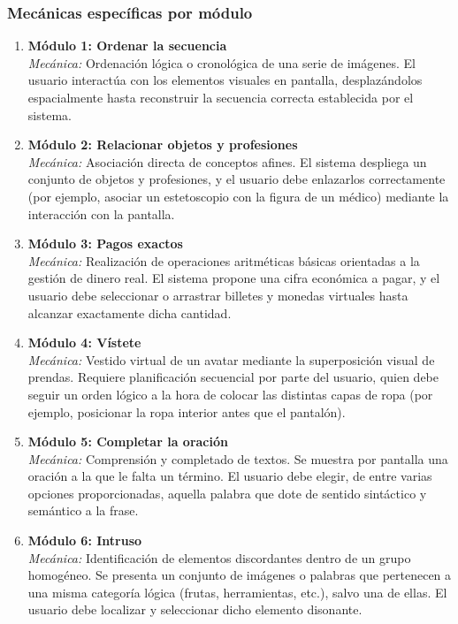 \subsubsection{Mecánicas específicas por módulo}
\begin{enumerate}
    \item \textbf{Módulo 1: Ordenar la secuencia} \\
    \textit{Mecánica:} Ordenación lógica o cronológica de una serie de imágenes. El usuario interactúa con los elementos visuales en pantalla, desplazándolos espacialmente hasta reconstruir la secuencia correcta establecida por el sistema.
    
    \item \textbf{Módulo 2: Relacionar objetos y profesiones} \\
    \textit{Mecánica:} Asociación directa de conceptos afines. El sistema despliega un conjunto de objetos y profesiones, y el usuario debe enlazarlos correctamente (por ejemplo, asociar un estetoscopio con la figura de un médico) mediante la interacción con la pantalla.
    
    \item \textbf{Módulo 3: Pagos exactos} \\
    \textit{Mecánica:} Realización de operaciones aritméticas básicas orientadas a la gestión de dinero real. El sistema propone una cifra económica a pagar, y el usuario debe seleccionar o arrastrar billetes y monedas virtuales hasta alcanzar exactamente dicha cantidad.
    
    \item \textbf{Módulo 4: Vístete} \\
    \textit{Mecánica:} Vestido virtual de un avatar mediante la superposición visual de prendas. Requiere planificación secuencial por parte del usuario, quien debe seguir un orden lógico a la hora de colocar las distintas capas de ropa (por ejemplo, posicionar la ropa interior antes que el pantalón).
    
    \item \textbf{Módulo 5: Completar la oración} \\
    \textit{Mecánica:} Comprensión y completado de textos. Se muestra por pantalla una oración a la que le falta un término. El usuario debe elegir, de entre varias opciones proporcionadas, aquella palabra que dote de sentido sintáctico y semántico a la frase.
    
    \item \textbf{Módulo 6: Intruso} \\
    \textit{Mecánica:} Identificación de elementos discordantes dentro de un grupo homogéneo. Se presenta un conjunto de imágenes o palabras que pertenecen a una misma categoría lógica (frutas, herramientas, etc.), salvo una de ellas. El usuario debe localizar y seleccionar dicho elemento disonante.
\end{enumerate}

